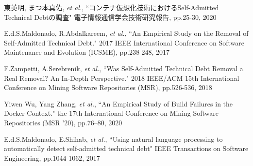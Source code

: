 \documentclass[a4j,10pt,a4paper, fleqn]{jsarticle}\usepackage{stylefile}
\begin{document}
\begin{thebibliography}{9}

\vspace{-3mm}

東英明, まつ本真佑, \textit{et al.}, ``コンテナ仮想化技術におけるSelf-Admitted Technical Debtの調査" 電子情報通信学会技術研究報告, pp.25-30, 2020

E.d.S.Maldonado, R.Abdalkareem, \textit{et al.}, ``An Empirical Study on the Removal of Self-Admitted Technical Debt." 2017 IEEE International Conference on Software Maintenance and Evolution (ICSME), pp.238-248, 2017

F.Zampetti, A.Serebrenik, \textit{et al.}, ``Was Self-Admitted Technical Debt Removal a Real Removal? An In-Depth Perspective." 2018 IEEE/ACM 15th International Conference on Mining Software Repositories (MSR), pp.526-536, 2018

Yiwen Wu, Yang Zhang, \textit{et al.}, ``An Empirical Study of Build Failures in the Docker Context." the 17th International Conference on Mining Software Repositories (MSR '20), pp.76–80, 2020

E.d.S.Maldonado, E.Shihab, \textit{et al.}, ``Using natural language processing to automatically detect self-admitted technical debt" IEEE Transactions on Software Engineering, pp.1044-1062, 2017






\end{thebibliography}
\end{document}
